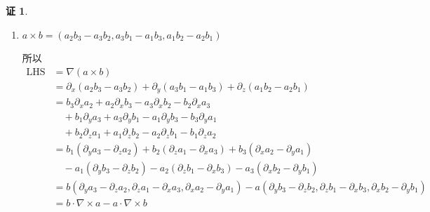 \documentclass[a4paper,12pt]{article}
\theoremstyle{definition}
\newtheorem*{pf}{证}
\begin{document}
\begin{pf}
\begin{enumerate}
              所以$\nabla\cdot(\phi a)=\phi(\partial_x+\partial_y+\partial_z) a+ a(\partial_x+\partial_y+\partial_z)\phi=\phi\nabla a+ a\nabla\phi$
        \item $a\times b=(a_2b_3-a_3b_2, a_3b_1-a_1b_3, a_1b_2-a_2b_1)$

              所以
              \begin{align*}
                  \text{LHS}
                   & =\nabla(a\times b)                                                                                                                                                                 \\
                   & =\partial_x(a_2b_3-a_3b_2)+\partial_y(a_3b_1-a_1b_3)+\partial_z(a_1b_2-a_2b_1)                                                                                                     \\
                   & =b_3\partial_xa_2+a_2\partial_xb_3-a_3\partial_xb_2-b_2\partial_xa_3                                                                                                               \\
                   & \quad+b_1\partial_ya_3+a_3\partial_yb_1-a_1\partial_yb_3-b_3\partial_ya_1                                                                                                          \\
                   & \quad+b_2\partial_za_1+a_1\partial_zb_2-a_2\partial_zb_1-b_1\partial_za_2                                                                                                          \\
                   & =b_1(\partial_ya_3-\partial_za_2)+b_2(\partial_za_1-\partial_xa_3)+b_3(\partial_xa_2-\partial_ya_1)                                                                                \\
                   & \quad-a_1(\partial_yb_3-\partial_zb_2)-a_2(\partial_zb_1-\partial_xb_3)-a_3(\partial_xb_2-\partial_yb_1)                                                                           \\
                   & =b(\partial_ya_3-\partial_za_2, \partial_za_1-\partial_xa_3, \partial_xa_2-\partial_ya_1)-a(\partial_yb_3-\partial_zb_2, \partial_zb_1-\partial_xb_3, \partial_xb_2-\partial_yb_1) \\
                   & =b\cdot\nabla\times a-a\cdot\nabla\times b                                                                                                                                         \\

\end{align*}
\end{enumerate}
\end{pf}
\end{document}
